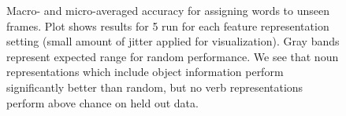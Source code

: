 \documentclass[11pt]{article}
\begin{document}
\begin{figure}[ht!]
\centering
{}%
%
%
\caption{Macro- and micro-averaged accuracy for assigning words to unseen frames. Plot shows results for 5 run for each feature representation setting (small amount of jitter applied for visualization). Gray bands represent expected range for random performance. We see that noun representations which include object information perform significantly better than random, but no verb representations perform above chance on held out data.}
\label{fig:macro_micro}
\end{figure}
\end{document}
